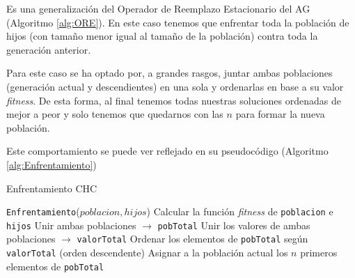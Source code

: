 Es una generalización del Operador de Reemplazo Estacionario del AG (Algoritmo \ref{alg:ORE}). 
En este caso tenemos que enfrentar toda la población de hijos (con tamaño menor igual al tamaño de la población) contra toda la generación anterior. 

Para este caso se ha optado por, a grandes rasgos, juntar ambas poblaciones (generación actual y descendientes) en una sola y ordenarlas en base a su valor \textit{fitness}. 
De esta forma, al final	tenemos todas nuestras soluciones ordenadas de mejor a peor y solo tenemos que quedarnos con las $n$ para formar la nueva población. 

Este comportamiento se puede ver reflejado en su pseudocódigo (Algoritmo \ref{alg:Enfrentamiento})

\begin{algorithm}[H]
\caption{Enfrentamiento CHC}\label{alg:Enfrentamiento}
\begin{algorithmic}[1]
\Procedure \texttt{Enfrentamiento}($poblacion, hijos$)
\State Calcular la función \textit{fitness} de \texttt{poblacion} e \texttt{hijos}
\State Unir ambas poblaciones $\xrightarrow{}{}$ \texttt{pobTotal}
\State Unir los valores de ambas poblaciones $\xrightarrow{}{}$ \texttt{valorTotal} 
\State Ordenar los elementos de \texttt{pobTotal} según \texttt{valorTotal} (orden descendente)
\State Asignar a la población actual los $n$ primeros elementos de \texttt{pobTotal}
\EndProcedure
\end{algorithmic}
\end{algorithm}
